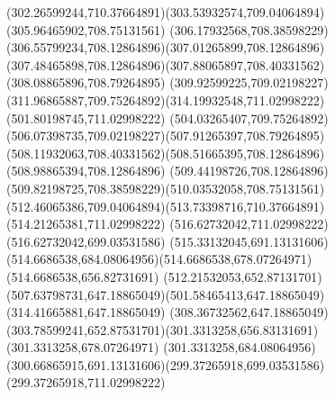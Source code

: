{{	\curveto(302.26599244,710.37664891)(303.53932574,709.04064894)(305.96465902,708.75131561)
	\curveto(306.17932568,708.38598229)(306.55799234,708.12864896)(307.01265899,708.12864896)
	\curveto(307.48465898,708.12864896)(307.88065897,708.40331562)(308.08865896,708.79264895)
	\curveto(309.92599225,709.02198227)(311.96865887,709.75264892)(314.19932548,711.02998222)
	\lineto(501.80198745,711.02998222)
	\curveto(504.03265407,709.75264892)(506.07398735,709.02198227)(507.91265397,708.79264895)
	\curveto(508.11932063,708.40331562)(508.51665395,708.12864896)(508.98865394,708.12864896)
	\curveto(509.44198726,708.12864896)(509.82198725,708.38598229)(510.03532058,708.75131561)
	\curveto(512.46065386,709.04064894)(513.73398716,710.37664891)(514.21265381,711.02998222)
	\lineto(516.62732042,711.02998222)
	\lineto(516.62732042,699.03531586)
	\curveto(515.33132045,691.13131606)(514.6686538,684.08064956)(514.6686538,678.07264971)
	\lineto(514.6686538,656.82731691)
	\curveto(512.21532053,652.87131701)(507.63798731,647.18865049)(501.58465413,647.18865049)
	\lineto(314.41665881,647.18865049)
	\curveto(308.36732562,647.18865049)(303.78599241,652.87531701)(301.3313258,656.83131691)
	\lineto(301.3313258,678.07264971)
	\curveto(301.3313258,684.08064956)(300.66865915,691.13131606)(299.37265918,699.03531586)
	\lineto(299.37265918,711.02998222)
	\closepath
}
}
\fi
